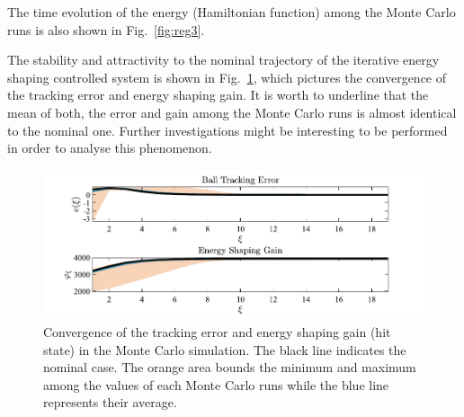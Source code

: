 The time evolution of the energy (Hamiltonian function) among the Monte Carlo runs is also shown in Fig.~\ref{fig:reg3}.

The stability and attractivity to the nominal trajectory of the iterative energy shaping controlled system is shown in Fig.~\ref{fig:reg4}, which pictures the convergence of the tracking error and energy shaping gain. It is worth to underline that the mean of both, the error and gain among the Monte Carlo runs is almost identical to the nominal one. Further investigations might be interesting to be performed in order to analyse this phenomenon.
\begin{figure}[t!]
	\centering
	\includegraphics[width = \linewidth]{Figures/reg4.pdf}
	\caption[Convergence of the tracking error and controller gain in the Monte Carlo simulation]{Convergence of the tracking error and energy shaping gain (hit state) in the Monte Carlo simulation. The black line indicates the nominal case. The orange area bounds the minimum and maximum among the values of each Monte Carlo runs while the blue line represents their average.}
	\label{fig:reg4}
\end{figure}

